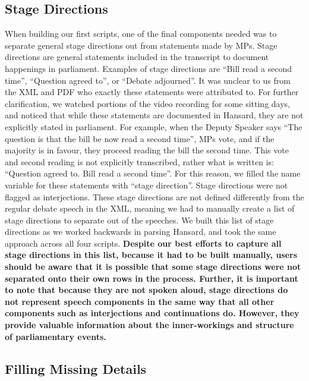 \documentclass[
  letterpaper,
  DIV=11,
  numbers=noendperiod]{scrartcl}
\begin{document}
\hypertarget{sec-stage}{%
\subsection{Stage Directions}\label{sec-stage}}

When building our first scripts, one of the final components needed was
to separate general stage directions out from statements made by MPs.
Stage directions are general statements included in the transcript to
document happenings in parliament. Examples of stage directions are
``Bill read a second time'', ``Question agreed to'', or ``Debate
adjourned''. It was unclear to us from the XML and PDF who exactly these
statements were attributed to. For further clarification, we watched
portions of the video recording for some sitting days, and noticed that
while these statements are documented in Hansard, they are not
explicitly stated in parliament. For example, when the Deputy Speaker
says ``The question is that the bill be now read a second time'', MPs
vote, and if the majority is in favour, they proceed reading the bill
the second time. This vote and second reading is not explicitly
transcribed, rather what is written is: ``Question agreed to. Bill read
a second time''. For this reason, we filled the name variable for these
statements with ``stage direction''. Stage directions were not flagged
as interjections. These stage directions are not defined differently
from the regular debate speech in the XML, meaning we had to manually
create a list of stage directions to separate out of the speeches. We
built this list of stage directions as we worked backwards in parsing
Hansard, and took the same approach across all four scripts.
\textbf{Despite our best efforts to capture all stage directions in this
list, because it had to be built manually, users should be aware that it
is possible that some stage directions were not separated onto their own
rows in the process. Further, it is important to note that because they
are not spoken aloud, stage directions do not represent speech
components in the same way that all other components such as
interjections and continuations do. However, they provide valuable
information about the inner-workings and structure of parliamentary
events.}

\hypertarget{filling-missing-details}{%
\subsection{Filling Missing Details}\label{filling-missing-details}}
\end{document}
